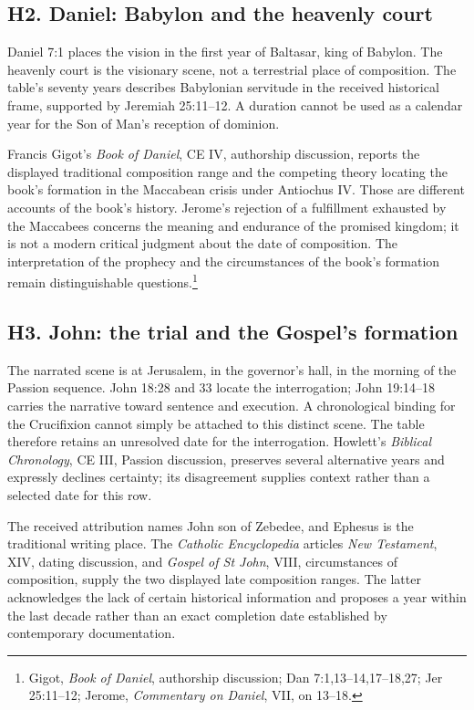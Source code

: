 \subsection{H2. Daniel: Babylon and the heavenly court}
\label{history-daniel}
Daniel 7:1 places the vision in the first year of Baltasar, king of Babylon. The heavenly court is the visionary scene, not a terrestrial place of composition. The table's seventy years describes Babylonian servitude in the received historical frame, supported by Jeremiah 25:11--12. A duration cannot be used as a calendar year for the Son of Man's reception of dominion.

Francis Gigot's \emph{Book of Daniel}, CE IV, authorship discussion, reports the displayed traditional composition range and the competing theory locating the book's formation in the Maccabean crisis under Antiochus IV. Those are different accounts of the book's history. Jerome's rejection of a fulfillment exhausted by the Maccabees concerns the meaning and endurance of the promised kingdom; it is not a modern critical judgment about the date of composition. The interpretation of the prophecy and the circumstances of the book's formation remain distinguishable questions.\footnote{Gigot, \emph{Book of Daniel}, authorship discussion; Dan 7:1,13--14,17--18,27; Jer 25:11--12; Jerome, \emph{Commentary on Daniel}, VII, on 13--18.}

\subsection{H3. John: the trial and the Gospel's formation}
\label{history-john}
The narrated scene is at Jerusalem, in the governor's hall, in the morning of the Passion sequence. John 18:28 and 33 locate the interrogation; John 19:14--18 carries the narrative toward sentence and execution. A chronological binding for the Crucifixion cannot simply be attached to this distinct scene. The table therefore retains an unresolved date for the interrogation. Howlett's \emph{Biblical Chronology}, CE III, Passion discussion, preserves several alternative years and expressly declines certainty; its disagreement supplies context rather than a selected date for this row.

The received attribution names John son of Zebedee, and Ephesus is the traditional writing place. The \emph{Catholic Encyclopedia} articles \emph{New Testament}, XIV, dating discussion, and \emph{Gospel of St John}, VIII, circumstances of composition, supply the two displayed late composition ranges. The latter acknowledges the lack of certain historical information and proposes a year within the last decade rather than an exact completion date established by contemporary documentation.

